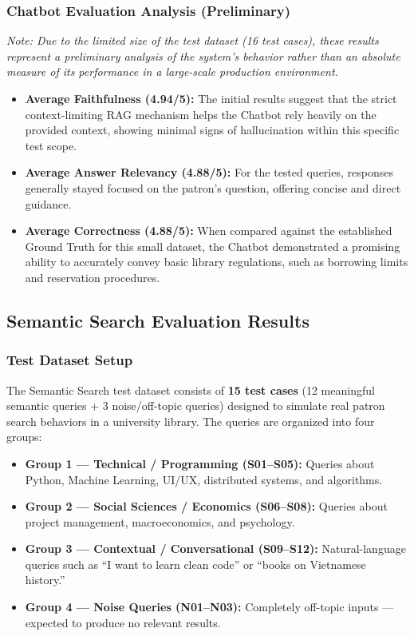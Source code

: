 \subsubsection{Chatbot Evaluation Analysis (Preliminary)}

\textit{Note: Due to the limited size of the test dataset (16 test cases), these results represent a preliminary analysis of the system's behavior rather than an absolute measure of its performance in a large-scale production environment.}

\begin{itemize}
    \item \textbf{Average Faithfulness (4.94/5):} The initial results suggest that the strict context-limiting RAG mechanism helps the Chatbot rely heavily on the provided context, showing minimal signs of hallucination within this specific test scope.
    \item \textbf{Average Answer Relevancy (4.88/5):} For the tested queries, responses generally stayed focused on the patron's question, offering concise and direct guidance.
    \item \textbf{Average Correctness (4.88/5):} When compared against the established Ground Truth for this small dataset, the Chatbot demonstrated a promising ability to accurately convey basic library regulations, such as borrowing limits and reservation procedures.
\end{itemize}

\subsection{Semantic Search Evaluation Results}

\subsubsection{Test Dataset Setup}

The Semantic Search test dataset consists of \textbf{15 test cases} (12 meaningful semantic queries + 3 noise/off-topic queries) designed to simulate real patron search behaviors in a university library. The queries are organized into four groups:

\begin{itemize}
    \item \textbf{Group 1 --- Technical / Programming (S01--S05):} Queries about Python, Machine Learning, UI/UX, distributed systems, and algorithms.
    \item \textbf{Group 2 --- Social Sciences / Economics (S06--S08):} Queries about project management, macroeconomics, and psychology.
    \item \textbf{Group 3 --- Contextual / Conversational (S09--S12):} Natural-language queries such as ``I want to learn clean code'' or ``books on Vietnamese history.''
    \item \textbf{Group 4 --- Noise Queries (N01--N03):} Completely off-topic inputs --- expected to produce no relevant results.
\end{itemize}

